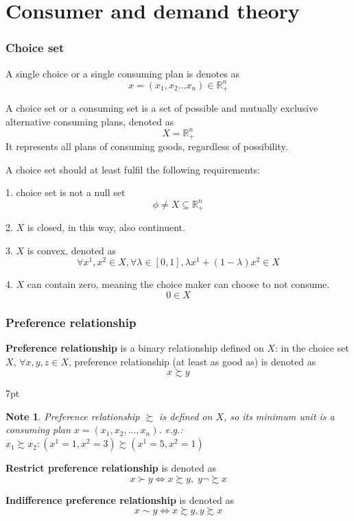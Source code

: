 \documentclass{article}
\newenvironment{blueblock}{
\def\FrameCommand{
  \hspace{1pt}
    {\color{DarkBlue}
    \vrule width 2pt}
    {\color{blueshade}
    \vrule width 4pt}
  \colorbox{blueshade}
}
\MakeFramed{
  \advance
  \hsize-
  \width
  \FrameRestore}
\noindent\hspace{-4.55pt}%
\begin{adjustwidth}{}{7pt}
\vspace{2pt}\vspace{2pt}
}
{\vspace{2pt}\end{adjustwidth}\endMakeFramed}
\newtheorem{note}{Note}
\begin{document}
\newpage
\part{Consumer and demand theory}

\newpage
\section{Choice set}
A single choice or a single consuming plan is denotes as
$$x=(x_{1},x_{2}...x_{n})\in \mathbb{R}_{+}^{n}$$

A choice set or a consuming set is a set of possible and mutually exclusive alternative consuming plans, denoted as 
$$X= \mathbb{R}_{+}^{n} $$
It represents all plans of consuming goods, regardless of possibility.

A choice set should at least fulfil the following requirements:

1. choice set is not a null set
$$\phi\neq X \subseteq \mathbb{R}_{+}^{n}$$

2. $X$ is closed, in this way, also continuent.

3. $X$ is convex, denoted as
$$\forall x^{1},x^{2}\in X, \forall \lambda\in[0,1],\lambda x^{1}+(1-\lambda)x^{2}\in X$$

4. $X$ can contain zero, meaning the choice maker can choose to not consume.
$$0\in X$$

\section{Preference relationship}
\textbf{Preference relationship} is a binary relationship defined on $X$:
in the choice set $X$, $\forall x,y,z \in X$, preference relationship (at least as good as) is denoted as
$$x\succsim y$$

\begin{blueblock}
\begin{note}
Preference relationship $\succsim$ is defined on $X$, so its minimum unit is a consuming plan $x=(x_{1},x_{2},...,x_{n})$.
e.g.: $x_{1}\succsim x_{2}:(x^{1}=1,x^{2}=3)\succsim (x^{1}=5,x^{2}=1)$
\end{note}
\end{blueblock}

\textbf{Restrict preference relationship} is denoted as 
$$x\succ y \iff x \succsim y, \; y \neg\succsim x$$

\textbf{Indifference preference relationship} is denoted as
$$x \sim y \iff x \succsim y, y\succsim x$$
\end{document}
